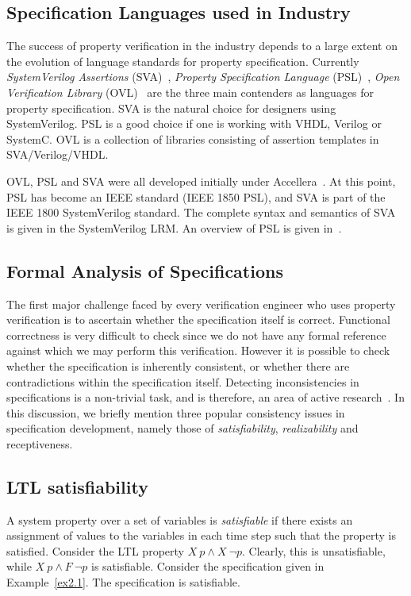 \subsection{Specification Languages used in Industry} \label{sec2.1.5}
The success of property verification in the industry depends to a large
extent on the evolution of language standards for property specification.
Currently {\em SystemVerilog Assertions} (SVA)~\cite{sva}, 
{\em Property Specification Language} (PSL)~\cite{psl},
{\em Open Verification Library} (OVL)~\cite{ovl}
are the three main contenders as languages for 
property specification. SVA is the natural choice for designers using
SystemVerilog. PSL is a good choice if one is working with VHDL, Verilog
or SystemC. OVL is a collection of libraries consisting of assertion 
templates in SVA/Verilog/VHDL.

\noindent
OVL, PSL and SVA were all developed initially under 
Accellera~\cite{accellera}. At this point, PSL has become
an IEEE standard (IEEE 1850 PSL), and SVA is part of the IEEE 1800 
SystemVerilog standard.  The complete syntax and semantics of SVA is given
in the SystemVerilog LRM. An overview of PSL is given in~\cite{perry:05}. 

\subsection{Formal Analysis of Specifications} 
The first major challenge faced by every verification engineer who uses
property verification is
to ascertain whether the specification itself is correct. Functional
correctness is very difficult to check since we do not have any formal
reference against which we may perform this verification. However it is
possible to check whether the specification is inherently consistent, or
whether there are contradictions within the specification itself.
Detecting inconsistencies in specifications is a non-trivial task, and
is therefore, an area of active research~\cite{pdgbook, prosyd}.
In this discussion, we briefly mention three popular consistency issues
in specification development, namely those of {\em satisfiability},
{\em realizability} and receptiveness. 

\subsection{LTL satisfiability} \label{sec2.2.1}
A system property over a set of variables is {\em satisfiable} if there
exists an assignment of values to the variables in each time step such that
the property is satisfied. Consider the LTL property $X\ p \land X\ \neg p$.
Clearly, this is unsatisfiable, while $X\ p \land F\ \neg p$ is
satisfiable. Consider the specification given in
Example~\ref{ex2.1}. The specification is satisfiable.


